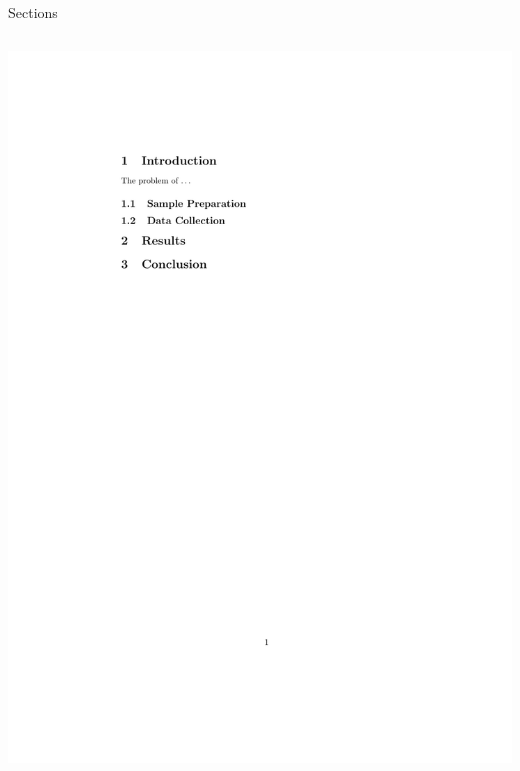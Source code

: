 \documentclass[,aspectratio=43]{beamer}
\begin{document}
\begin{frame}[fragile]{Sections}
\begin{columns}[T]
\begin{column}{0.43\textwidth}
\begin{center}\includegraphics[width=1\linewidth]{figure/sections} \end{center}
\end{column}
\end{columns}
\end{frame}
\end{document}
